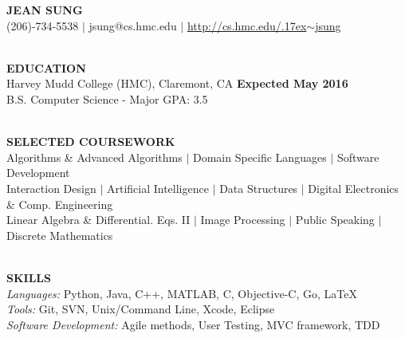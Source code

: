 \documentclass[11pt]{article}
\makeatletter
\newcommand{\selfName}{\textbf{\fontsize{30}{30}\selectfont JEAN SUNG }}
\newcommand{\email}{\large {jsung@cs.hmc.edu }}
\newcommand{\phone}{\large (206)-734-5538 }
\newcommand{\tildeText}{\raise.17ex\hbox{$\scriptstyle\sim$}}
\newcommand{\websitedisplaytext}{\large http://cs.hmc.edu/\tildeText jsung }
\newcommand{\website}{\href{http://cs.hmc.edu/~jsung}{\websitedisplaytext}}
\newcommand{\tag}{\textit{Passion for building software tools to better hanlde data analytics. }}
\newcommand{\wrapTitle}[1]{{\sectionNL \textbf{\Large #1}} \sectionNL}
\newcommand{\vb}{ $\mid$ }
\newcommand{\sectionNL}{~\\[1pt]}
\newcommand{\HMC}{HMC}
\newcommand{\rightAlign}{\hfill}
\makeatother
\begin{document}
\begin{center}
\selfName\\
\phone  
\vb\email 
\vb\website \\
\hrulefill
\end{center}


\begin{flushleft}
\wrapTitle{EDUCATION}
Harvey Mudd College (\HMC), Claremont, CA \rightAlign \textbf{Expected May 2016 } \\
B.S. Computer Science - Major GPA: 3.5   \\
\end{flushleft}


\begin{flushleft}
\wrapTitle{SELECTED COURSEWORK}
Algorithms \& Advanced Algorithms
\vb Domain Specific Languages 
\vb Software Development \\
Interaction Design 
\vb Artificial Intelligence 
\vb Data Structures 
\vb Digital Electronics \& Comp. Engineering \\
Linear Algebra \& Differential. Eqs. II
\vb Image Processing  
\vb Public Speaking
\vb Discrete Mathematics


\end{flushleft}


\begin{flushleft}
\wrapTitle{SKILLS}
\textit{Languages:} Python, Java, C++, MATLAB, C, Objective-C, Go, \LaTeX \\
\textit{Tools:} Git, SVN, Unix/Command Line, Xcode, Eclipse \\ %
\textit{Software Development:} Agile methods, User Testing, MVC framework, TDD 

\end{flushleft}
\end{document}
